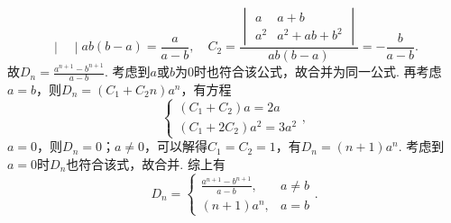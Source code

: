 \documentclass[UTF8,12pt,a4paper,fontset=fandol]{ctexart}
\begin{document}
\begin{solve}
\begin{enumerate}
\[{\begin{vmatrix}
                                \end{vmatrix}}{ab(b-a)}=\frac{a}{a-b},\quad
                            C_2=\frac{\begin{vmatrix}
                                    a   & a+b        \\
                                    a^2 & a^2+ab+b^2
                                \end{vmatrix}}{ab(b-a)}=-\frac{b}{a-b}.\]
                        故$D_n=\displaystyle\frac{a^{n+1}-b^{n+1}}{a-b}$. 考虑到$a$或$b$为0时也符合该公式，故合并为同一公式. 再考虑$a=b$，则$D_n=(C_1+C_2n)a^n$，有方程
                        \[\begin{cases}
                                (C_1+C_2)a=2a \\
                                (C_1+2C_2)a^2=3a^2
                            \end{cases},\]
                        $a=0$，则$D_n=0$；$a\neq 0$，可以解得$C_1=C_2=1$，有$D_n=(n+1)a^n$. 考虑到$a=0$时$D_n$也符合该式，故合并. 综上有
                        \[D_n=\begin{cases}
                                \displaystyle\frac{a^{n+1}-b^{n+1}}{a-b}, & a\neq b \\
                                (n+1)a^n,                                 & a=b
                            \end{cases}.\]


\end{enumerate}
\end{solve}
\end{document}
